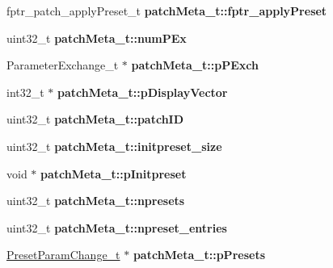 \begin{DoxyCompactItemize}
\item 
fptr\+\_\+patch\+\_\+apply\+Preset\+\_\+t {\bfseries patch\+Meta\+\_\+t\+::fptr\+\_\+apply\+Preset}\hypertarget{group__PATCH_gaf18454ab29feb8f514b1526c5942ee2c}{}\label{group__PATCH_gaf18454ab29feb8f514b1526c5942ee2c}

\item 
uint32\+\_\+t {\bfseries patch\+Meta\+\_\+t\+::num\+P\+Ex}\hypertarget{group__PATCH_gaaee0468f444e80723eacb98d90dae90c}{}\label{group__PATCH_gaaee0468f444e80723eacb98d90dae90c}

\item 
Parameter\+Exchange\+\_\+t $\ast$ {\bfseries patch\+Meta\+\_\+t\+::p\+P\+Exch}\hypertarget{group__PATCH_ga9aaf50aa4e0ccf354fe1778c7bae9c82}{}\label{group__PATCH_ga9aaf50aa4e0ccf354fe1778c7bae9c82}

\item 
int32\+\_\+t $\ast$ {\bfseries patch\+Meta\+\_\+t\+::p\+Display\+Vector}\hypertarget{group__PATCH_ga6fe4f2f8073649fc3ec743037b027ec1}{}\label{group__PATCH_ga6fe4f2f8073649fc3ec743037b027ec1}

\item 
uint32\+\_\+t {\bfseries patch\+Meta\+\_\+t\+::patch\+ID}\hypertarget{group__PATCH_gadc52ab96b12769d692a5a8e5f83708b1}{}\label{group__PATCH_gadc52ab96b12769d692a5a8e5f83708b1}

\item 
uint32\+\_\+t {\bfseries patch\+Meta\+\_\+t\+::initpreset\+\_\+size}\hypertarget{group__PATCH_ga35cbaf3310f82e9e87a3a9e948ae1da9}{}\label{group__PATCH_ga35cbaf3310f82e9e87a3a9e948ae1da9}

\item 
void $\ast$ {\bfseries patch\+Meta\+\_\+t\+::p\+Initpreset}\hypertarget{group__PATCH_ga1122304b8093fea34299d445bdca10bb}{}\label{group__PATCH_ga1122304b8093fea34299d445bdca10bb}

\item 
uint32\+\_\+t {\bfseries patch\+Meta\+\_\+t\+::npresets}\hypertarget{group__PATCH_ga8bbe7104e1eae4f3e7d73b8a8c248c83}{}\label{group__PATCH_ga8bbe7104e1eae4f3e7d73b8a8c248c83}

\item 
uint32\+\_\+t {\bfseries patch\+Meta\+\_\+t\+::npreset\+\_\+entries}\hypertarget{group__PATCH_gac54e8e5cb7c50f38834959dda1f559f3}{}\label{group__PATCH_gac54e8e5cb7c50f38834959dda1f559f3}

\item 
\hyperlink{structPresetParamChange__t}{Preset\+Param\+Change\+\_\+t} $\ast$ {\bfseries patch\+Meta\+\_\+t\+::p\+Presets}\hypertarget{group__PATCH_gac0d9e98bd92feca21c2f5910cf12a025}{}\label{group__PATCH_gac0d9e98bd92feca21c2f5910cf12a025}


\end{DoxyCompactItemize}
